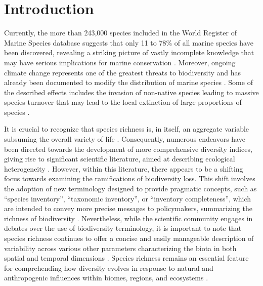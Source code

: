 \documentclass[12pt,authoryear]{elsarticle}
\begin{document}
\section{Introduction}

Currently, the more than 243,000 species included in the World Register of Marine Species database \citep{worms2022} suggests that only 11 to 78\% of all marine species have been discovered, revealing a striking picture of vastly incomplete knowledge that may have serious implications for marine conservation \citep{luypaert2020}.
Moreover, ongoing climate change represents one of the greatest threats to biodiversity \citep{malhi2020climate, turner2020climate} and has already been documented to modify the distribution of marine species \citep{lenoir2020species}. Some of the described effects includes the invasion of non-native species leading to massive species turnover that may lead to the local extinction of large proportions of species \citep{cheung2009}. 


It is crucial to recognize that species richness is, in itself, an aggregate variable subsuming the overall variety of life \citep{Marquet2004}. Consequently, numerous endeavors have been directed towards the development of more comprehensive diversity indices, giving rise to significant scientific literature, aimed at describing ecological heterogeneity \citep{tuomisto_commentary_2011, moreno_commentary_2011, daly_ecological_2018}. However, within this literature, there appears to be a shifting focus towards examining the ramifications of biodiversity loss. This shift involves the adoption of new terminology designed to provide pragmatic concepts, such as ``species inventory'', ``taxonomic inventory'', or ``inventory completeness'', which are intended to convey more precise messages to policymakers, summarizing the richness of biodiversity \citep{pereira_essential_2013, butchart_global_2010}. Nevertheless, while the scientific community engages in debates over the use of biodiversity terminology, it is important to note that species richness continues to offer a concise and easily manageable description of variability across various other parameters characterizing the biota in both spatial and temporal dimensions \citep{APPELTANS2012}. Species richness remains an essential feature for comprehending how diversity evolves in response to natural and anthropogenic influences within biomes, regions, and ecosystems \citep{troia2017, magurran2011}.
\end{document}

